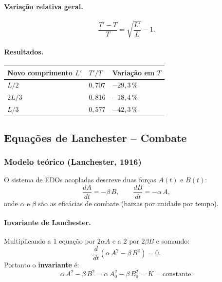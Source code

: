\documentclass[12pt,a4paper]{article}
\theoremstyle{definition}
\begin{document}
\paragraph{Varia\c{c}\~ao relativa geral.}
\begin{equation}
  \frac{T'-T}{T} = \sqrt{\frac{L'}{L}}-1.
\end{equation}

\paragraph{Resultados.}
\begin{center}
\begin{tabular}{lll}
\toprule
Novo comprimento $L'$ & $T'/T$ & Varia\c{c}\~ao em $T$\\
\midrule
$L/2$    & $0{,}707$ & $-29{,}3\,\%$\\
$2L/3$   & $0{,}816$ & $-18{,}4\,\%$\\
$L/3$    & $0{,}577$ & $-42{,}3\,\%$\\
\bottomrule
\end{tabular}
\end{center}

\subsection{Equa\c{c}\~oes de Lanchester -- Combate}

\subsubsection*{Modelo te\'orico (Lanchester, 1916)}

O sistema de EDOs acopladas descreve duas for\c{c}as $A(t)$ e $B(t)$:
\begin{equation}
  \frac{dA}{dt} = -\beta\,B, \qquad \frac{dB}{dt} = -\alpha\,A,
  \label{eq:lanchester}
\end{equation}
onde $\alpha$ e $\beta$ s\~ao as efic\'acias de combate (baixas por unidade por tempo).

\paragraph{Invariante de Lanchester.}
Multiplicando a 1\textordfeminine{} equa\c{c}\~ao por $2\alpha A$ e a 2\textordfeminine{}
por $2\beta B$ e somando:
\begin{equation}
  \frac{d}{dt}\!\left(\alpha\,A^2 - \beta\,B^2\right) = 0.
\end{equation}
Portanto o \textbf{invariante} \'e:
\begin{equation}
  \alpha\,A^2 - \beta\,B^2 = \alpha\,A_0^2 - \beta\,B_0^2 = K = \text{constante.}
  \label{eq:invariante}
\end{equation}
\end{document}
